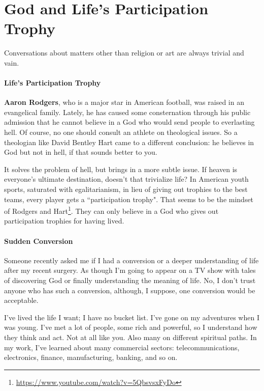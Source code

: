 \section{God and Life's Participation Trophy}

\begin{quotex}
Conversations about matters other than religion or art are always trivial and vain. 

\end{quotex}
\paragraph{Life's Participation Trophy}
\textbf{Aaron Rodgers}, who is a major star in American football, was raised in an evangelical family. Lately, he has caused some consternation through his public admission that he cannot believe in a God who would send people to everlasting hell. Of course, no one should consult an athlete on theological issues. So a theologian like David Bentley Hart came to a different conclusion: he believes in God but not in hell, if that sounds better to you.

It solves the problem of hell, but brings in a more subtle issue. If heaven is everyone's ultimate destination, doesn't that trivialize life? In American youth sports, saturated with egalitarianism, in lieu of giving out trophies to the best teams, every player gets a ``participation trophy". That seems to be the mindset of Rodgers and Hart\footnote{\url{https://www.youtube.com/watch?v=5QbsvsxFyDo}}. They can only believe in a God who gives out participation trophies for having lived.

\paragraph{Sudden Conversion}
Someone recently asked me if I had a conversion or a deeper understanding of life after my recent surgery. As though I'm going to appear on a TV show with tales of discovering God or finally understanding the meaning of life. No, I don't trust anyone who has such a conversion, although, I suppose, one conversion would be acceptable.

I've lived the life I want; I have no bucket list. I've gone on my adventures when I was young. I've met a lot of people, some rich and powerful, so I understand how they think and act. Not at all like you. Also many on different spiritual paths. In my work, I've learned about many commercial sectors: telecommunications, electronics, finance, manufacturing, banking, and so on.

